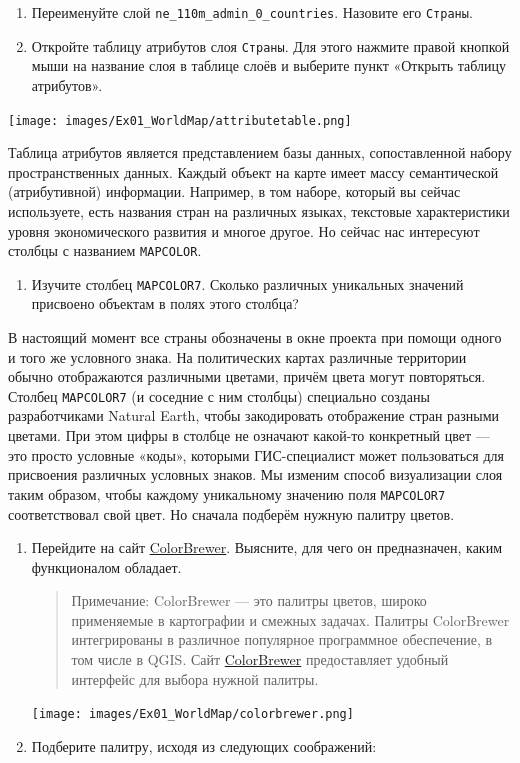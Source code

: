 \documentclass[
  12pt,
]{book}
\providecommand{\tightlist}{%
  \setlength{\itemsep}{0pt}\setlength{\parskip}{0pt}}
\begin{document}
\begin{enumerate}
\def\labelenumi{\arabic{enumi}.}
\item
  Переименуйте слой \texttt{ne\_110m\_admin\_0\_countries}. Назовите его \texttt{Страны}.
\item
  Откройте таблицу атрибутов слоя \texttt{Страны}. Для этого нажмите правой кнопкой мыши на название слоя в таблице слоёв и выберите пункт «Открыть таблицу атрибутов».
\end{enumerate}

\texttt{[image: images/Ex01\_WorldMap/attributetable.png]}

Таблица атрибутов является представлением базы данных, сопоставленной набору пространственных данных. Каждый объект на карте имеет массу семантической (атрибутивной) информации. Например, в том наборе, который вы сейчас используете, есть названия стран на различных языках, текстовые характеристики уровня экономического развития и многое другое. Но сейчас нас интересуют столбцы с названием \texttt{MAPCOLOR}.

\begin{enumerate}
\def\labelenumi{\arabic{enumi}.}
\tightlist
\item
  Изучите столбец \texttt{MAPCOLOR7}. Сколько различных уникальных значений присвоено объектам в полях этого столбца?
\end{enumerate}

В настоящий момент все страны обозначены в окне проекта при помощи одного и того же условного знака. На политических картах различные территории обычно отображаются различными цветами, причём цвета могут повторяться. Столбец \texttt{MAPCOLOR7} (и соседние с ним столбцы) специально созданы разработчиками Natural Earth, чтобы закодировать отображение стран разными цветами. При этом цифры в столбце не означают какой-то конкретный цвет --- это просто условные «коды», которыми ГИС-специалист может пользоваться для присвоения различных условных знаков. Мы изменим способ визуализации слоя таким образом, чтобы каждому уникальному значению поля \texttt{MAPCOLOR7} соответствовал свой цвет. Но сначала подберём нужную палитру цветов.

\begin{enumerate}
\def\labelenumi{\arabic{enumi}.}
\setcounter{enumi}{1}
\item
  Перейдите на сайт \href{https://colorbrewer2.org/}{ColorBrewer}. Выясните, для чего он предназначен, каким функционалом обладает.

  \begin{quote}
  Примечание: ColorBrewer --- это палитры цветов, широко применяемые в картографии и смежных задачах. Палитры ColorBrewer интегрированы в различное популярное программное обеспечение, в том числе в QGIS. Сайт \href{https://colorbrewer2.org/}{ColorBrewer} предоставляет удобный интерфейс для выбора нужной палитры.
  \end{quote}

  \texttt{[image: images/Ex01\_WorldMap/colorbrewer.png]}
\item
  Подберите палитру, исходя из следующих соображений:
\end{enumerate}
\end{document}
